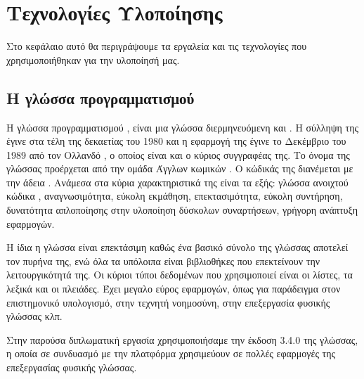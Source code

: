 \chapter{Τεχνολογίες Υλοποίησης}

Στο κεφάλαιο αυτό θα περιγράψουμε τα εργαλεία και τις τεχνολογίες που χρησιμοποιήθηκαν για την υλοποίησή μας. \\

\section{Η γλώσσα προγραμματισμού }

Η γλώσσα προγραμματισμού {} \cite{Py02}, \cite{Py01} είναι μια γλώσσα διερμηνευόμενη και {}. 
Η σύλληψη της {} έγινε στα τέλη της δεκαετίας του 1980 και η εφαρμογή της έγινε το Δεκέμβριο του 1989 από τον Ολλανδό {}, 
ο οποίος είναι και ο κύριος συγγραφέας της. Το όνομα της γλώσσας προέρχεται από την ομάδα Άγγλων κωμικών {}.
O κώδικάς της διανέμεται με την άδεια {}. 
Ανάμεσα στα κύρια χαρακτηριστικά της είναι τα εξής: γλώσσα ανοιχτού κώδικα {}, αναγνωσιμότητα, εύκολη εκμάθηση, 
επεκτασιμότητα, εύκολη συντήρηση, δυνατότητα απλοποίησης στην υλοποίηση δύσκολων συναρτήσεων, γρήγορη ανάπτυξη εφαρμογών.

\par Η ίδια η γλώσσα είναι επεκτάσιμη καθώς ένα βασικό σύνολο της γλώσσας αποτελεί τον πυρήνα της, 
ενώ όλα τα υπόλοιπα είναι βιβλιοθήκες {} που επεκτείνουν την λειτουργικότητά της. 
Oι κύριοι τύποι δεδομένων που χρησιμοποιεί είναι οι λίστες, τα λεξικά και οι πλειάδες. 
Έχει μεγαλο εύρος εφαρμογών, όπως για παράδειγμα στον επιστημονικό υπολογισμό, στην τεχνητή νοημοσύνη, 
στην επεξεργασία φυσικής γλώσσας κλπ.

\par Στην παρούσα διπλωματική εργασία χρησιμοποιήσαμε την έκδοση 3.4.0 της γλώσσας, 
η οποία σε συνδυασμό με την πλατφόρμα {} χρησιμεύουν σε πολλές εφαρμογές της επεξεργασίας φυσικής γλώσσας.

\section{}

